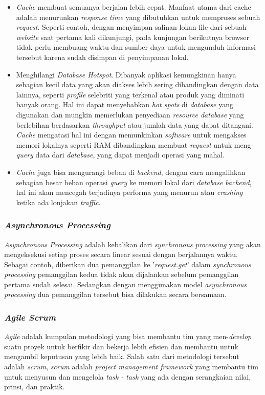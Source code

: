 \documentclass[a4paper]{article}
\newcommand{\subsubbab}[1]{%
    \subsubsection{#1}%
}
\begin{document}
\begin{itemize}
    \item \textit{Cache} membuat semuanya berjalan lebih cepat. Manfaat utama dari cache adalah menurunkan \textit{response time} yang dibutuhkan untuk memproses sebuah \textit{request}. Seperti contoh, dengan menyimpan salinan lokan file dari sebuah \textit{website} saat pertama kali dikunjungi, pada kunjungan berikutnya browser tidak perlu membuang waktu dan sumber daya untuk mengunduh informasi tersebut karena sudah disimpan di penyimpanan lokal\autocite{businessinsider_cache}.

    \item Menghilangi \textit{Database Hotspot}. Dibanyak aplikasi kemungkinan hanya sebagian kecil data yang akan diakses lebih sering dibandingkan dengan data lainnya, seperti \textit{profile} selebriti yang terkenal atau produk yang diminati banyak orang. Hal ini dapat menyebabkan \textit{hot spots} di \textit{database} yang digunakan dan mungkin memerlukan penyediaan \textit{resource database} yang berlebihan berdasarkan \textit{throughput} atau jumlah data yang dapat ditangani\autocite{AWS-caching}. \textit{Cache} mengatasi hal ini dengan memunkinkan \textit{software} untuk mengakses memori lokalnya seperti RAM dibandingkan membuat \textit{request} untuk meng-\textit{query} data dari \textit{database}, yang dapat menjadi operasi yang mahal.

    \item \textit{Cache} juga bisa mengurangi beban di \textit{backend}, dengan cara mengalihkan sebagian besar beban operasi \textit{query} ke memori lokal dari \textit{database backend}, hal ini akan mencegah terjadinya performa yang menurun atau \textit{crashing} ketika ada lonjakan \textit{traffic}.
\end{itemize}



\subsubbab{\textit{Asynchronous Processing}}
\textit{Asynchronous Processing} adalah kebalikan dari \textit{synchronous processing} yang akan mengeksekusi setiap proses secara linear sesuai dengan berjalannya waktu. Sebagai contoh, diberikan dua pemanggilan ke '\textit{request.get}' dalam \textit{synchronous processing} pemanggilan kedua tidak akan dijalankan sebelum pemanggilan pertama sudah selesai. Sedangkan dengan menggunakan model \textit{asynchronous processing} dua pemanggilan tersebut bisa dilakukan secara bersamaan\autocite{Williams_Benfield_Warner_Zadka_Mitchell_Samuel_Tardy_2019}.

\subsubbab{\textit{Agile Scrum}}
\textit{Agile} adalah kumpulan metodologi yang bisa membantu tim yang men-\textit{develop} suatu proyek untuk berfikir dan bekerja lebih efisien dan membantu untuk mengambil keputusan yang lebih baik\autocite{Stellman_Greene_2016}. Salah satu dari metodologi tersebut adalah \textit{scrum}, \textit{scrum} adalah \textit{project management framework} yang membantu tim untuk menyusun dan mengelola \textit{task - task} yang ada dengan serangkaian nilai, prinsi, dan praktik\autocite{atlassian-agile-scrum}.
\end{document}
